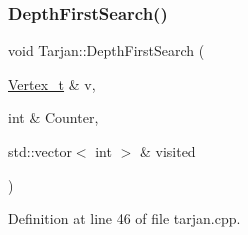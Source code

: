 \mbox{\label{class_tarjan_a277c58dc6f712a6ae1ef2e59c9ad58e1}} 
\subsubsection{\texorpdfstring{Depth\+First\+Search()}{DepthFirstSearch()}}
{\footnotesize\ttfamily void Tarjan\+::\+Depth\+First\+Search (\begin{DoxyParamCaption}\item[{\hyperlink{class_graph_component_ae67114a6ce5a001dc35e1996e1b45aa0}{Vertex\+\_\+t} \&}]{v,  }\item[{int \&}]{Counter,  }\item[{std\+::vector$<$ int $>$ \&}]{visited }\end{DoxyParamCaption})}



Definition at line 46 of file tarjan.\+cpp.


